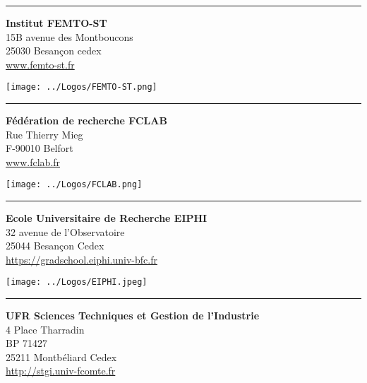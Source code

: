 \hrule
%
\vspace{1.5mm}
\noindent
\begin{minipage}{0.55\textwidth}
\textbf{Institut FEMTO-ST}\\
15B avenue des Montboucons\\
25030 Besançon cedex\\
\url{www.femto-st.fr}
\end{minipage}
\begin{minipage}{0.43\textwidth}
	\centering \texttt{[image: ../Logos/FEMTO-ST.png]}
\end{minipage}
\vspace{1.5mm}
\hrule
%
\vspace{1.5mm}
\noindent
\begin{minipage}{0.55\textwidth}
\textbf{Fédération de recherche FCLAB}\\
Rue Thierry Mieg\\
F-90010 Belfort\\
\url{www.fclab.fr}
\end{minipage}
\begin{minipage}{0.43\textwidth}
\centering \texttt{[image: ../Logos/FCLAB.png]}
\end{minipage}
\vspace{1.5mm}
\hrule
%
\vspace{1.5mm}
\noindent
\begin{minipage}{0.55\textwidth}
\textbf{Ecole Universitaire de Recherche EIPHI}\\
32 avenue de l'Observatoire\\
25044 Besançon Cedex\\
\url{https://gradschool.eiphi.univ-bfc.fr}
\end{minipage}
\begin{minipage}{0.43\textwidth}
\centering \texttt{[image: ../Logos/EIPHI.jpeg]}
\end{minipage}
\vspace{1.5mm}
\hrule
%
\vspace{1.5mm}
\noindent
\begin{minipage}{0.55\textwidth}
\textbf{UFR Sciences Techniques et Gestion de l’Industrie}\\
4 Place Tharradin\\
BP 71427\\
25211 Montbéliard Cedex\\
\url{http://stgi.univ-fcomte.fr}
\end{minipage}
